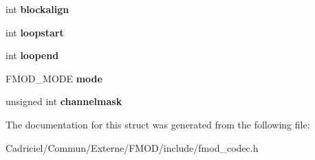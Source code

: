 \begin{DoxyCompactItemize}
\item 
int {\bfseries blockalign}\hypertarget{struct_f_m_o_d___c_o_d_e_c___w_a_v_e_f_o_r_m_a_t_a46df2a2789c6c438cd773762ed397a6f}{}\label{struct_f_m_o_d___c_o_d_e_c___w_a_v_e_f_o_r_m_a_t_a46df2a2789c6c438cd773762ed397a6f}

\item 
int {\bfseries loopstart}\hypertarget{struct_f_m_o_d___c_o_d_e_c___w_a_v_e_f_o_r_m_a_t_ae795e36327ba4772301f09501b2a8cc0}{}\label{struct_f_m_o_d___c_o_d_e_c___w_a_v_e_f_o_r_m_a_t_ae795e36327ba4772301f09501b2a8cc0}

\item 
int {\bfseries loopend}\hypertarget{struct_f_m_o_d___c_o_d_e_c___w_a_v_e_f_o_r_m_a_t_af6fe45ead433ef4bdb8d3e74859900f2}{}\label{struct_f_m_o_d___c_o_d_e_c___w_a_v_e_f_o_r_m_a_t_af6fe45ead433ef4bdb8d3e74859900f2}

\item 
F\+M\+O\+D\+\_\+\+M\+O\+DE {\bfseries mode}\hypertarget{struct_f_m_o_d___c_o_d_e_c___w_a_v_e_f_o_r_m_a_t_a1f23ba212c380e08e9d0b83f16a00320}{}\label{struct_f_m_o_d___c_o_d_e_c___w_a_v_e_f_o_r_m_a_t_a1f23ba212c380e08e9d0b83f16a00320}

\item 
unsigned int {\bfseries channelmask}\hypertarget{struct_f_m_o_d___c_o_d_e_c___w_a_v_e_f_o_r_m_a_t_aced974dac899dfe17cc5299453904281}{}\label{struct_f_m_o_d___c_o_d_e_c___w_a_v_e_f_o_r_m_a_t_aced974dac899dfe17cc5299453904281}

\end{DoxyCompactItemize}


The documentation for this struct was generated from the following file\+:\begin{DoxyCompactItemize}
\item 
Cadriciel/\+Commun/\+Externe/\+F\+M\+O\+D/include/fmod\+\_\+codec.\+h\end{DoxyCompactItemize}
